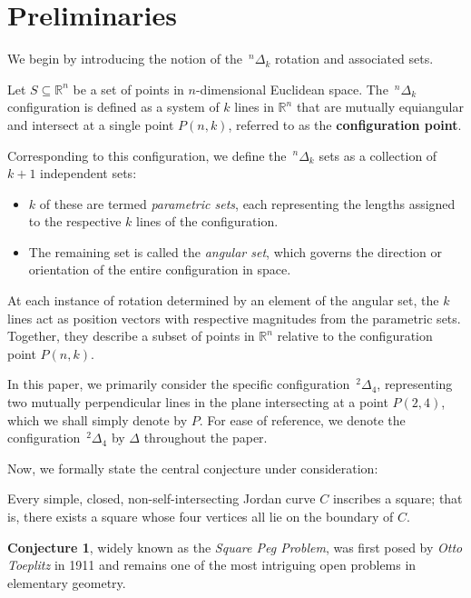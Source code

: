 \section{Preliminaries}

We begin by introducing the notion of the $\,^n \Delta_k$ rotation and associated sets.

Let $S \subseteq \mathbb{R}^n$ be a set of points in $n$-dimensional Euclidean space. The $\,^n \Delta_k$ configuration is defined as a system of $k$ lines in $\mathbb{R}^n$ that are mutually equiangular and intersect at a single point $P(n, k)$, referred to as the \textbf{configuration point}.

Corresponding to this configuration, we define the $\,^n \Delta_k$ sets as a collection of $k+1$ independent sets:  
\begin{itemize}
    \item $k$ of these are termed \textit{parametric sets}, each representing the lengths assigned to the respective $k$ lines of the configuration.  
    \item The remaining set is called the \textit{angular set}, which governs the direction or orientation of the entire configuration in space.
\end{itemize}

At each instance of rotation determined by an element of the angular set, the $k$ lines act as position vectors with respective magnitudes from the parametric sets. Together, they describe a subset of points in $\mathbb{R}^n$ relative to the configuration point $P(n, k)$.

In this paper, we primarily consider the specific configuration $\,^2 \Delta_4$, representing two mutually perpendicular lines in the plane intersecting at a point $P(2, 4)$, which we shall simply denote by $P$. For ease of reference, we denote the configuration $\,^2 \Delta_4$ by $\Delta$ throughout the paper.

Now, we formally state the central conjecture under consideration:

\begin{conjecture}
Every simple, closed, non-self-intersecting Jordan curve $C$ inscribes a square; that is, there exists a square whose four vertices all lie on the boundary of $C$.
\end{conjecture}

\textbf{Conjecture 1}, widely known as the \emph{Square Peg Problem}, was first posed by \emph{Otto Toeplitz} in 1911 and remains one of the most intriguing open problems in elementary geometry.

